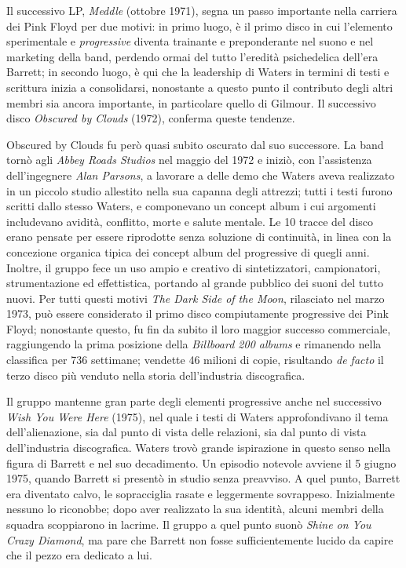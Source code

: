 \documentclass[class=book, crop=false, oneside, 12pt]{standalone}
\begin{document}
    Il successivo LP, \emph{Meddle} (ottobre 1971), segna un passo importante nella carriera dei Pink Floyd per due motivi: in primo luogo, è il primo disco in cui l'elemento sperimentale e \emph{progressive} diventa trainante e preponderante nel suono e nel marketing della band, perdendo ormai del tutto l'eredità psichedelica dell'era Barrett; in secondo luogo, è qui che la leadership di Waters in termini di testi e scrittura inizia a consolidarsi, nonostante a questo punto il contributo degli altri membri sia ancora importante, in particolare quello di Gilmour. Il successivo disco \emph{Obscured by Clouds} (1972), conferma queste tendenze.

    Obscured by Clouds fu però quasi subito oscurato dal suo successore. La band tornò agli \emph{Abbey Roads Studios} nel maggio del 1972 e iniziò, con l'assistenza dell'ingegnere \emph{Alan Parsons}, a lavorare a delle demo che Waters aveva realizzato in un piccolo studio allestito nella sua capanna degli attrezzi; tutti i testi furono scritti dallo stesso Waters, e componevano un concept album i cui argomenti includevano avidità, conflitto, morte e salute mentale. Le 10 tracce del disco erano pensate per essere riprodotte senza soluzione di continuità, in linea con la concezione organica tipica dei concept album del progressive di quegli anni. Inoltre, il gruppo fece un uso ampio e creativo di sintetizzatori, campionatori, strumentazione ed effettistica, portando al grande pubblico dei suoni del tutto nuovi. Per tutti questi motivi \emph{The Dark Side of the Moon}, rilasciato nel marzo 1973, può essere considerato il primo disco compiutamente progressive dei Pink Floyd; nonostante questo, fu fin da subito il loro maggior successo commerciale, raggiungendo la prima posizione della \emph{Billboard 200 albums} e rimanendo nella classifica per 736 settimane; vendette 46 milioni di copie, risultando \emph{de facto} il terzo disco più venduto nella storia dell'industria discografica.

    Il gruppo mantenne gran parte degli elementi progressive anche nel successivo \emph{Wish You Were Here} (1975), nel quale i testi di Waters approfondivano il tema dell'alienazione, sia dal punto di vista delle relazioni, sia dal punto di vista dell'industria discografica. Waters trovò grande ispirazione in questo senso nella figura di Barrett e nel suo decadimento. Un episodio notevole avviene il 5 giugno 1975, quando Barrett si presentò in studio senza preavviso. A quel punto, Barrett era diventato calvo, le sopracciglia rasate e leggermente sovrappeso. Inizialmente nessuno lo riconobbe; dopo aver realizzato la sua identità, alcuni membri della squadra scoppiarono in lacrime. Il gruppo a quel punto suonò \emph{Shine on You Crazy Diamond}, ma pare che Barrett non fosse sufficientemente lucido da capire che il pezzo era dedicato a lui.
\end{document}
